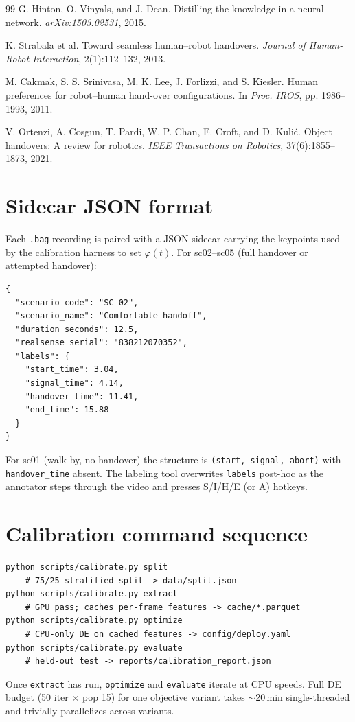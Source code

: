 \documentclass{article}
\newcommand{\code}[1]{\texttt{\small #1}}
\begin{document}
\begin{thebibliography}{99}
 G. Hinton, O. Vinyals, and J. Dean. Distilling the knowledge in a neural network. \emph{arXiv:1503.02531}, 2015.

 K. Strabala et al. Toward seamless human--robot handovers. \emph{Journal of Human-Robot Interaction}, 2(1):112--132, 2013.

 M. Cakmak, S. S. Srinivasa, M. K. Lee, J. Forlizzi, and S. Kiesler. Human preferences for robot--human hand-over configurations. In \emph{Proc. IROS}, pp. 1986--1993, 2011.

 V. Ortenzi, A. Cosgun, T. Pardi, W. P. Chan, E. Croft, and D. Kuli\'c. Object handovers: A review for robotics. \emph{IEEE Transactions on Robotics}, 37(6):1855--1873, 2021.

\end{thebibliography}

\appendix

\section{Sidecar JSON format}\label{app:sidecar}

Each \code{.bag} recording is paired with a JSON sidecar carrying the keypoints used by the calibration harness to set $\varphi(t)$. For sc02--sc05 (full handover or attempted handover):
\begin{lstlisting}
{
  "scenario_code": "SC-02",
  "scenario_name": "Comfortable handoff",
  "duration_seconds": 12.5,
  "realsense_serial": "838212070352",
  "labels": {
    "start_time": 3.04,
    "signal_time": 4.14,
    "handover_time": 11.41,
    "end_time": 15.88
  }
}
\end{lstlisting}
For sc01 (walk-by, no handover) the structure is \code{(start, signal, abort)} with \code{handover\_time} absent. The labeling tool overwrites \code{labels} post-hoc as the annotator steps through the video and presses S/I/H/E (or A) hotkeys.

\section{Calibration command sequence}\label{app:cmd}

\begin{lstlisting}
python scripts/calibrate.py split
    # 75/25 stratified split -> data/split.json
python scripts/calibrate.py extract
    # GPU pass; caches per-frame features -> cache/*.parquet
python scripts/calibrate.py optimize
    # CPU-only DE on cached features -> config/deploy.yaml
python scripts/calibrate.py evaluate
    # held-out test -> reports/calibration_report.json
\end{lstlisting}
Once \code{extract} has run, \code{optimize} and \code{evaluate} iterate at CPU speeds. Full DE budget (50 iter $\times$ pop 15) for one objective variant takes $\sim$20\,min single-threaded and trivially parallelizes across variants.
\end{document}
